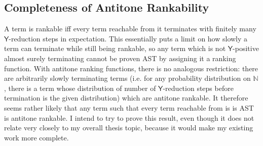\documentclass[titlepage]{article}
\newcommand{\tY}{\mathsf{Y}}
\begin{document}
\subsection{Completeness of Antitone Rankability}
A term is rankable iff every term reachable from it terminates with finitely many $\tY$-reduction steps in expectation. This essentially puts a limit on how slowly a term can terminate while still being rankable, so any term which is not $\tY$-positive almost surely terminating cannot be proven AST by assigning it a ranking function. With antitone ranking functions, there is no analogous restriction: there are arbitrarily slowly terminating terms (i.e. for any probability distribution on $\mathbb N$, there is a term whose distribution of number of $\tY$-reduction steps before termination is the given distribution) which are antitone rankable. It therefore seems rather likely that any term such that every term reachable from is is AST is antitone rankable. I intend to try to prove this result, even though it does not relate very closely to my overall thesis topic, because it would make my existing work more complete.



\end{document}
